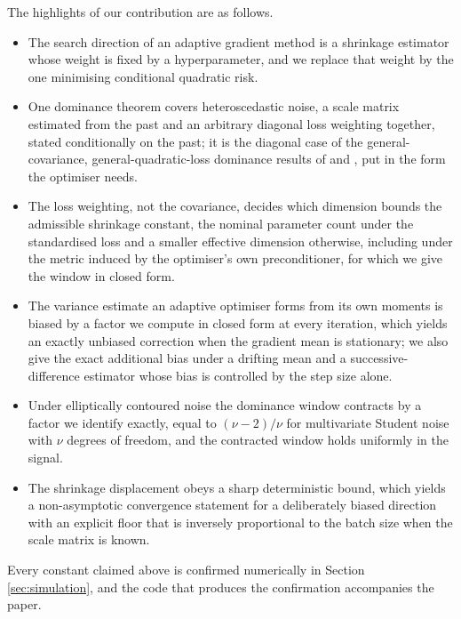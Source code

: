 \documentclass[a4paper,fleqn]{cas-dc}
\theoremstyle{plain}
\theoremstyle{definition}
\theoremstyle{remark}
\newcommand{\rev}[1]{#1}
\begin{document}
The highlights of our contribution are as follows. 
\begin{itemize}

\item The search direction of an adaptive gradient method is a shrinkage estimator whose weight is fixed by a hyperparameter, and we replace that weight by the one minimising conditional quadratic risk.

\item One dominance theorem covers heteroscedastic noise, a scale matrix estimated from the past and an arbitrary diagonal loss weighting together\rev{, stated conditionally on the past; it is the diagonal case of the general-covariance, general-quadratic-loss dominance results of \citet{bock1975} and \citet{berger1976jmva}, put in the form the optimiser needs.}

\item The loss weighting, not the covariance, decides which dimension bounds the admissible shrinkage constant, the nominal parameter count under the standardised loss and a smaller effective dimension otherwise\rev{, including under the metric induced by the optimiser's own preconditioner, for which we give the window in closed form.}

\item The variance estimate an adaptive optimiser forms from its own moments is biased by a factor we compute in closed form at every iteration, which yields an exactly unbiased correction\rev{ when the gradient mean is stationary; we also give the exact additional bias under a drifting mean and a successive-difference estimator whose bias is controlled by the step size alone.}

\item Under elliptically contoured noise the dominance window contracts by a factor we identify exactly, equal to $(\nu-2)/\nu$ for multivariate Student noise with $\nu$ degrees of freedom\rev{, and the contracted window holds uniformly in the signal.}

\item The shrinkage displacement obeys a sharp deterministic bound, which yields a non-asymptotic convergence statement for a deliberately biased direction with an explicit floor that is inversely proportional to the batch size\rev{ when the scale matrix is known.}

\end{itemize}

Every constant claimed above is confirmed numerically in Section \ref{sec:simulation}, and the code that produces the confirmation accompanies the paper.
\end{document}
